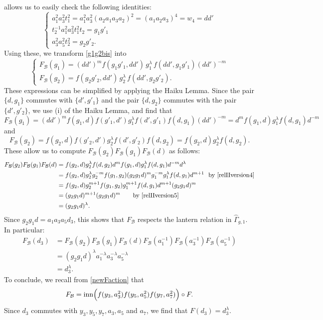 \documentclass[a4paper,10pt,reqno]{amsart}
\newcommand\GGone{\widehat{\Gamma}_{g,1}}
\begin{document}
allows us to easily check the following identities:
\begin{equation}\label{a1a3}
\begin{cases}
a_1^2a_3^2t_1^2=a_1^2a_3^2(a_2a_1a_3a_2)^2=(a_1a_2a_3)^4=w_4=dd'\\
t_2^{-1}a_1^2a_3^2t_1^2t_2=g_1g'_1\\       
a_3^2a_5^2t_2^2=g_2g'_2.  
\end{cases}
\end{equation}
Using these, we transform \eqref{g1g2bis} into
\begin{equation}\label{g1g2ter}
\begin{cases}
F_{\mathcal{B}}(g_1)=(dd')^m f(g_1g'_1,dd')\,g_1^\lambda\, f(dd',g_1g'_1)(dd')^{-m}\\
F_{\mathcal{B}}(g_2)=f(g_2g'_2,dd')\,g_2^\lambda\, f(dd',g_2g'_2). 
\end{cases}
\end{equation}
These expressions can be simplified by applying the Haiku Lemma.
Since the pair $\{d,g_1\}$ commutes with $\{d',g'_1\}$ and the pair $\{d,g_2\}$ 
commutes with the pair $\{d',g'_2\}$, we use (i) of the Haiku Lemma, and find that
$$F_{\mathcal{B}}(g_1)=(dd')^mf(g_1,d)f(g'_1,d')g_1^\lambda f(d',g'_1)f(d,g_1)(dd')^{-m} =d^m f(g_1,d)g_1^\lambda f(d,g_1)d^{-m}$$
and
$$F_{\mathcal{B}}(g_2)=f(g_2,d)f(g'_2,d')g_2^\lambda f(d',g'_2)f(d,g_2)=f(g_2,d)g_2^\lambda f(d,g_2).$$
These allow us to compute 
$F_{\mathcal{B}}(g_2)F_{\mathcal{B}}(g_1)F_{\mathcal{B}}(d)$ as follows:
\begin{align*}
F_{\mathcal{B}}(g_2)F_{\mathcal{B}}(g_1)F_{\mathcal{B}}(d)&=f(g_2,d)g_2^\lambda f(d,g_2)d^mf(g_1,d)g_1^\lambda
f(d,g_1)d^{-m}d^\lambda\\
&=f(g_2,d)g_2^\lambda g_2^{-m}f(g_1,g_2)(g_2g_1d)^m g_1^{-m}g_1^\lambda f(d,g_1)d^{m+1}
\ \ \hbox{by}\ \eqref{relIIversion4}\\
&=f(g_2,d)g_2^{m+1}f(g_1,g_2)g_1^{m+1}f(d,g_1)d^{m+1}(g_2g_1d)^m\\
&=(g_2g_1d)^{m+1}(g_2g_1d)^m\hfill\qquad \hbox{by}\ \eqref{relIIversion5}\\
&=(g_2g_1d)^\lambda.
\end{align*}
Since $g_2g_1d=a_1a_3a_5d_3$, this shows that $F_{\mathcal{B}}$ respects the lantern relation 
 in $\GGone$. In particular:
\begin{align*}
F_{\mathcal{B}}(d_3)&=F_{\mathcal{B}}(g_2)F_{\mathcal{B}}(g_1)F_{\mathcal{B}}(d)F_{\mathcal{B}}(a_1^{-1})F_{\mathcal{B}}(a_3^{-1})
F_{\mathcal{B}}(a_5^{-1})\\
&=(g_2g_1d)^\lambda a_1^{-\lambda}a_3^{-\lambda}a_5^{-\lambda}\\
&=d_3^\lambda.
\end{align*}
To conclude, we recall from \eqref{newFaction} that 
$$F_{\mathcal{B}}={\rm inn}\Bigl(f(y_3,a_3^2)f(y_5,a_5^2)f(y_7,a_7^2)\Bigr)\circ F.$$
Since $d_3$ commutes with $y_3,y_5,y_7,a_3,a_5$ and $a_7$, we find that $F(d_3)=d_3^\lambda$.
\end{document}
